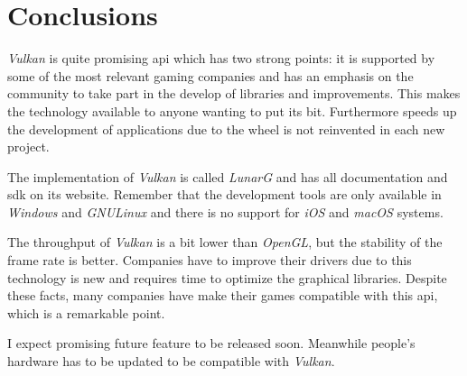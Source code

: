 \chapter{Conclusions}
\emph{Vulkan} is quite promising \gls{api} which has two strong points: it is supported by some of the most relevant
gaming companies and has an emphasis on the community to take part in the develop of libraries and improvements. This
makes the technology available to anyone wanting to put its bit. Furthermore speeds up the development of applications
due to the wheel is not reinvented in each new project.

The implementation of \emph{Vulkan} is called \emph{LunarG} and has all documentation and \gls{sdk} on its website.
Remember that the development tools are only available in \emph{Windows} and \emph{GNU\/Linux} and there is no support
for \emph{iOS} and \emph{macOS} systems.

The throughput of \emph{Vulkan} is a bit lower than \emph{OpenGL}, but the stability of the frame rate is better.
Companies have to improve their drivers due to this technology is new and requires time to optimize the graphical
libraries. Despite these facts, many companies have make their games compatible with this \gls{api}, which is a
remarkable point.

I expect promising future feature to be released soon. Meanwhile people's hardware has to be updated to be compatible
with \emph{Vulkan}.
